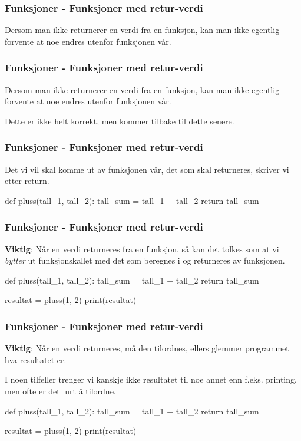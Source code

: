 
\begin{frame}
    \frametitle{Funksjoner - Funksjoner med retur-verdi}

    Dersom man ikke returnerer en verdi fra en funksjon, kan man ikke egentlig forvente at noe endres utenfor funksjonen vår. 

\end{frame}

\begin{frame}
    \frametitle{Funksjoner - Funksjoner med retur-verdi}

    Dersom man ikke returnerer en verdi fra en funksjon, kan man ikke egentlig forvente at noe endres utenfor funksjonen vår. 

    Dette er ikke helt korrekt, men kommer tilbake til dette senere. 

\end{frame}

\begin{frame}[fragile]
    \frametitle{Funksjoner - Funksjoner med retur-verdi}

    Det vi vil skal komme ut av funksjonen vår, det som skal returneres, skriver vi etter return. 

\begin{python}
def pluss(tall_1, tall_2):
    tall_sum = tall_1 + tall_2
    return tall_sum
\end{python}

\end{frame}

\begin{frame}[fragile]
    \frametitle{Funksjoner - Funksjoner med retur-verdi}

    \textbf{Viktig}: Når en verdi returneres fra en funksjon, så kan det tolkes som at vi \textit{bytter} ut funksjonskallet med det som beregnes i og returneres av funksjonen. 

\begin{python}
def pluss(tall_1, tall_2):
    tall_sum = tall_1 + tall_2
    return tall_sum

resultat = pluss(1, 2)
print(resultat)
\end{python}

\end{frame}

\begin{frame}[fragile]
    \frametitle{Funksjoner - Funksjoner med retur-verdi}

    \textbf{Viktig}: Når en verdi returneres, må den tilordnes, ellers glemmer programmet hva resultatet er. 

    I noen tilfeller trenger vi kanskje ikke resultatet til noe annet enn f.eks. printing, men ofte er det lurt å tilordne. 

\begin{python}
def pluss(tall_1, tall_2):
    tall_sum = tall_1 + tall_2
    return tall_sum

resultat = pluss(1, 2)
print(resultat)
\end{python}

\end{frame}

